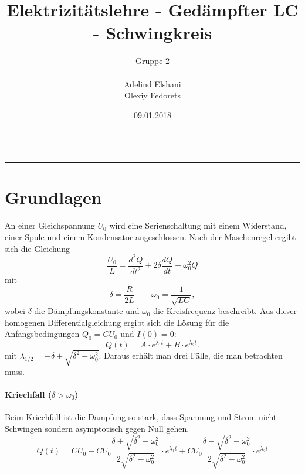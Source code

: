 \documentclass[a4paper, 11pt]{article}
\title{Elektrizitätslehre - Gedämpfter LC - Schwingkreis}
\author{Gruppe 2 \\ \\ Adelind Elshani \\ Olexiy Fedorets}
\date{09.01.2018}
\begin{document}
\begin{titlepage}
	\vspace*{\fill}
	\begin{center}
		\textheight
		\vfill
		\newcommand{\Line}{\rule{\linewidth}{0.6mm}}
		\Line 
		{\let\newpage\relax\maketitle}
		\Line 
		\vfill
	\end{center}
	\vspace*{\fill}
	\thispagestyle{empty}
\end{titlepage}


\newpage
\thispagestyle{empty}
\tableofcontents
\newpage

\pagestyle{fancy}
\fancyhf{}
\fancyhead[L]{\nouppercase{\leftmark}}
\fancyhead[R]{\thepage}
\renewcommand{\headrulewidth}{0.5pt}
\fancyfoot[C]{\thepage}


\setcounter{page}{1}

\section{Grundlagen}
An einer Gleichspannung $U_0$ wird eine Serienschaltung mit einem Widerstand, einer Spule und einem Kondensator angeschlossen. Nach der Maschenregel ergibt sich die Gleichung
\begin{equation}
\frac{U_0}{L} = \frac{d^2Q}{dt^2} + 2\delta \frac{dQ}{dt} + \omega_0^2 Q
\end{equation}
mit 
\begin{equation}
\delta = \frac{R}{2L}  \qquad \omega_0 = \frac{1}{\sqrt{LC}},
\end{equation}
wobei $\delta$ die Dämpfungskonstante und $\omega_0$ die Kreisfrequenz beschreibt.
Aus dieser homogenen Differentialgleichung  ergibt sich die Lösung für die Anfangsbedingungen $Q_0 = CU_0$ und $I(0) = 0$:
\begin{equation}
Q(t) = A \cdot e^{\lambda_1 t} + B \cdot e^{\lambda_2 t}.
\end{equation} 
mit $\lambda_{1/2} = -\delta \pm \sqrt{\delta^2 - \omega_0^2}$. Daraus erhält man drei Fälle, die man betrachten muss.
\paragraph{Kriechfall ($\delta > \omega_0$)}
Beim Kriechfall ist die Dämpfung so stark, dass Spannung und Strom nicht Schwingen sondern asymptotisch gegen Null gehen.
\begin{equation}
Q(t) = CU_0 - CU_0 \frac{\delta + \sqrt{\delta^2 -\omega_0^2}}{2\sqrt{\delta^2 -\omega_0^2}} \cdot e^{\lambda_1 t} +  CU_0 \frac{\delta - \sqrt{\delta^2 -\omega_0^2}}{2\sqrt{\delta^2 -\omega_0^2}} \cdot e^{\lambda_2 t}
\end{equation}
\end{document}
